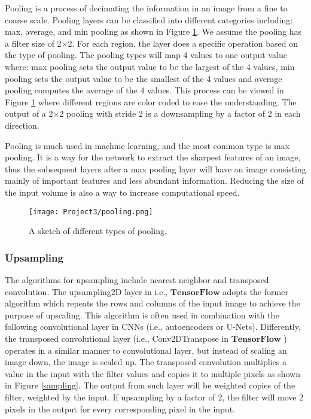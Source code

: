 \documentclass[a4paper]{article}
\begin{document}
Pooling is a process of decimating the information in an image from a fine to coarse scale. Pooling layers can be classified into different categories including: max, average, and min pooling as shown in Figure \ref{pooling}. We assume the pooling has a filter size of 2$\times$2. For each region, the layer does a specific operation based on the type of pooling. The pooling types will map 4 values to one output value where: max pooling sets the output value to be the largest of the 4 values, min pooling sets the output value to be the smallest of the 4 values and average pooling computes the average of the 4 values. This process can be viewed in Figure \ref{pooling} where different regions are color coded to ease the understanding. The output of a 2$\times$2 pooling with stride 2 is a downsampling by a factor of 2 in each direction.

Pooling is much used in machine learning, and the most common type is max pooling. It is a way for the network to extract the sharpest features of an image, thus the subsequent layers after a max pooling layer will have an image consisting mainly of important features and less abundant information. Reducing the size of the input volume is also a way to increase computational speed. 

\begin{figure}[H]
  \centering
  \texttt{[image: Project3/pooling.png]}
  \caption{A sketch of different types of pooling.}
    \label{pooling}
\end{figure}

\subsubsection{Upsampling}

The algorithms for upsampling include nearest neighbor and transposed convolution. The upsampling2D layer in i.e., $\mathbf{TensorFlow}$ \cite{Tensorflow} adopts the former algorithm which repeats the rows and columns of the input image to achieve the purpose of upscaling. This algorithm is often used in combination with the following convolutional layer in CNNs (i.e., autoencoders or U-Nets). Differently, the transposed convolutional layer (i.e., Conv2DTranspose in $\mathbf{TensorFlow}$ \cite{Tensorflow}) operates in a similar manner to convolutional layer, but instead of scaling an image down, the image is scaled up. The transposed convolution multiplies a value in the input with the filter values and copies it to multiple pixels as shown in Figure \ref{sampling}. The output from such layer will be weighted copies of the filter, weighted by the input. If upsampling by a factor of 2, the filter will move 2 pixels in the output for every corresponding pixel in the input.
\end{document}

